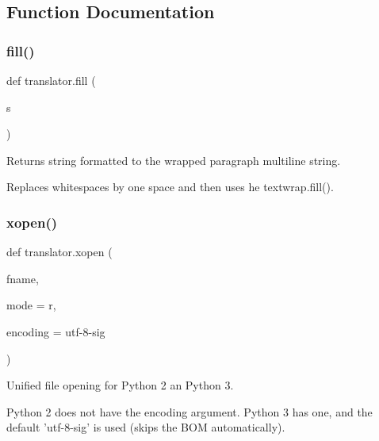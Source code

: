 \subsection{Function Documentation}
\mbox{\label{namespacetranslator_ab1f88f7e883aa197f4f24466397ca1bc}} 
\subsubsection{\texorpdfstring{fill()}{fill()}}
{\footnotesize\ttfamily def translator.\+fill (\begin{DoxyParamCaption}\item[{}]{s }\end{DoxyParamCaption})}

\begin{DoxyVerb}Returns string formatted to the wrapped paragraph multiline string.

Replaces whitespaces by one space and then uses he textwrap.fill().\end{DoxyVerb}
 \mbox{\label{namespacetranslator_af67a3c62e84dd7699326522b41955c86}} 
\subsubsection{\texorpdfstring{xopen()}{xopen()}}
{\footnotesize\ttfamily def translator.\+xopen (\begin{DoxyParamCaption}\item[{}]{fname,  }\item[{}]{mode = {\ttfamily \textquotesingle{}r\textquotesingle{}},  }\item[{}]{encoding = {\ttfamily \textquotesingle{}utf-\/8-\/sig\textquotesingle{}} }\end{DoxyParamCaption})}

\begin{DoxyVerb}Unified file opening for Python 2 an Python 3.

Python 2 does not have the encoding argument. Python 3 has one, and
the default 'utf-8-sig' is used (skips the BOM automatically).
\end{DoxyVerb}
 